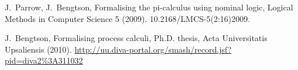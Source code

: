 \documentclass[GCNS]{yincog}
\theoremstyle{remark}
\theoremstyle{theorem}
\theoremstyle{remark}
\begin{document}
\begin{backmatter}
\begin{thebibliography}{}
\begin{bsubitem}
\begin{bcontribution}%
\end{bcontribution}
\begin{bhost}
\begin{bissue}
\end{bissue}
\end{bhost}
\end{bsubitem}
%
\OrigBibText
J.~Parrow, J.~Bengtson, Formalising the pi-calculus using nominal logic,
Logical Methods in Computer Science 5 (2009). 10.2168/LMCS-5(2:16)2009.
\endOrigBibText
{}%
\endbibitem

\begin{bsubitem}
\begin{bcontribution}%
\end{bcontribution}
\prnsep{,\ }
\begin{bhost}
\begin{bbook}[class=report]
\end{bbook}
\end{bhost}
\begin{bhost}
\begin{behost}
\end{behost}
\end{bhost}
\end{bsubitem}
%
\OrigBibText
J.~Bengtson,
{Formalising
process calculi}, Ph.D. thesis, Acta Universitatis Upsaliensis (2010).
\url{http://uu.diva-portal.org/smash/record.jsf?pid=diva2\%3A311032}
\endOrigBibText
{}%
\endbibitem


\end{thebibliography}
\end{backmatter}
\end{document}
